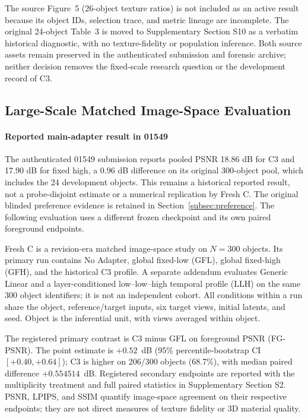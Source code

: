 \documentclass[times,twocolumn,final]{elsarticle}
\begin{document}
The source Figure~5 (26-object texture ratios) is not included as an active result because its object IDs, selection trace, and metric lineage are incomplete. The original 24-object Table~3 is moved to Supplementary Section S10 as a verbatim historical diagnostic, with no texture-fidelity or population inference. Both source assets remain preserved in the authenticated submission and forensic archive; neither decision removes the fixed-scale research question or the development record of C3.

\subsection{Large-Scale Matched Image-Space Evaluation}
\label{subsec:largescale}

\paragraph{Reported main-adapter result in 01549}
The authenticated 01549 submission reports pooled PSNR 18.86 dB for C3 and 17.90 dB for fixed high, a 0.96 dB difference on its original 300-object pool, which includes the 24 development objects. This remains a historical reported result, not a probe-disjoint estimate or a numerical replication by Fresh C. The original blinded preference evidence is retained in Section~\ref{subsec:preference}. The following evaluation uses a different frozen checkpoint and its own paired foreground endpoints.

Fresh C is a revision-era matched image-space study on $N=300$ objects. Its primary run contains No Adapter, global fixed-low (GFL), global fixed-high (GFH), and the historical C3 profile. A separate addendum evaluates Generic Linear and a layer-conditioned low--low--high temporal profile (LLH) on the same 300 object identifiers; it is not an independent cohort. All conditions within a run share the object, reference/target inputs, six target views, initial latents, and seed. Object is the inferential unit, with views averaged within object.

The registered primary contrast is C3 minus GFL on foreground PSNR (FG-PSNR). The point estimate is $+0.52$~dB (95\% percentile-bootstrap CI $[+0.40,+0.64]$); C3 is higher on 206/300 objects (68.7\%), with median paired difference $+0.554514$~dB. Registered secondary endpoints are reported with the multiplicity treatment and full paired statistics in Supplementary Section S2. PSNR, LPIPS, and SSIM quantify image-space agreement on their respective endpoints; they are not direct measures of texture fidelity or 3D material quality.
\end{document}

